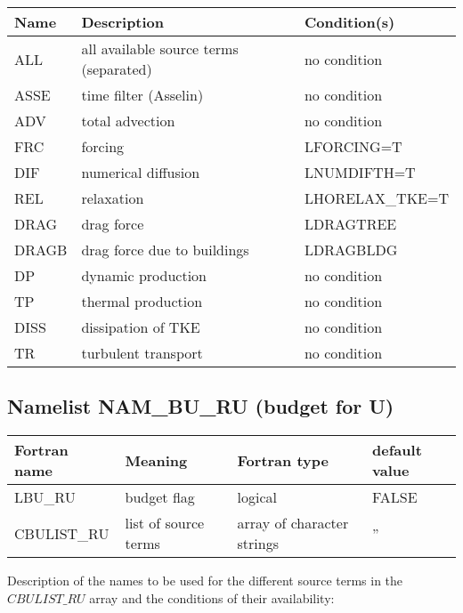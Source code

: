 \begin{longtable} {|p{}|p{}|p{}|}
\hline
Name & Description & Condition(s) \\
\hline \hline
\endhead
ALL    & all available source terms (separated) & no condition \\\hline \hline
ASSE   & time filter (Asselin)        & no condition    \\\hline
ADV    & total advection              & no condition    \\\hline
FRC    & forcing                      & LFORCING=T      \\\hline
DIF    & numerical diffusion          & LNUMDIFTH=T     \\\hline
REL    & relaxation                   & LHORELAX\_TKE=T \\\hline
DRAG   & drag force                   & LDRAGTREE       \\\hline
DRAGB  & drag force due to buildings  & LDRAGBLDG       \\\hline
DP     & dynamic production           & no condition    \\\hline
TP     & thermal production           & no condition    \\\hline
DISS   & dissipation of TKE           & no condition    \\\hline
TR     & turbulent transport          & no condition    \\\hline
\end{longtable}


\subsection{Namelist NAM\_BU\_RU (budget for U)}

\begin{longtable} {|p{}|p{}|>{\centering}p{}|p{}<{\centering}|}
\hline
Fortran name & Meaning & Fortran type & default value \\
\hline \hline
\endhead
LBU\_RU & budget flag & logical & FALSE\index{LBU\_RU!\innam{NAM\_BU\_RU}} \\\hline
CBULIST\_RU & list of source terms & array of character strings & ''\index{CBULIST\_RU!\innam{NAM\_BU\_RU}} \\\hline
\end{longtable}

Description of the names to be used for the different source terms in the $CBULIST\_RU$ array and the conditions of their availability:

